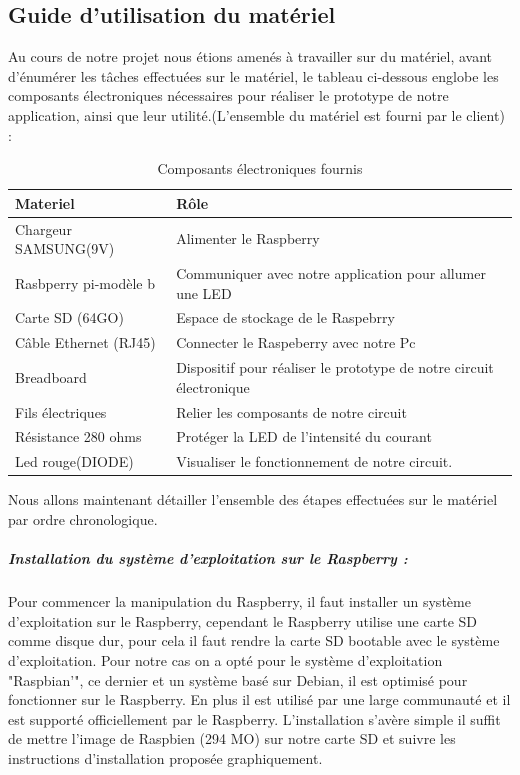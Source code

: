 \documentclass[12pt,a4paper]{article}
\begin{document}
\subsection{Guide d'utilisation du matériel}
Au cours de notre projet nous étions amenés à travailler sur du matériel, avant d'énumérer les tâches effectuées sur le matériel, le tableau ci-dessous englobe les composants électroniques nécessaires pour réaliser le prototype de notre application, ainsi que leur utilité.(L'ensemble du matériel est fourni par le client) : 
\par
\begin{table}[H]
\centering

\label{tableau3}
\begin{tabular}{|l|l|}
\hline
Materiel                      & Rôle                                                                \\ \hline
Chargeur  SAMSUNG(9V) & Alimenter le Raspberry                                              \\ \hline
Rasbperry pi-modèle b         & Communiquer avec notre application pour  allumer  une LED              \\ \hline
Carte SD (64GO)               & Espace de stockage de le Raspebrry                                  \\ \hline
Câble Ethernet (RJ45)         & Connecter le Raspeberry avec notre Pc                               \\ \hline
Breadboard                    & Dispositif pour réaliser le prototype de notre circuit électronique \\ \hline
Fils électriques              & Relier les composants de notre circuit                              \\ \hline
Résistance 280 ohms           & Protéger la LED de l'intensité du courant                           \\ \hline
Led rouge(DIODE)                     & Visualiser le fonctionnement de notre circuit.                      \\ \hline
\end{tabular}
\caption{Composants électroniques fournis}
\end{table}
\par
Nous allons maintenant détailler l'ensemble des étapes effectuées sur le matériel par ordre chronologique.\par 

\subparagraph{Installation du système d'exploitation sur le Raspberry :} 
Pour commencer la manipulation du Raspberry, il faut installer un système d'exploitation sur le Raspberry, cependant le Raspberry utilise une carte SD comme disque dur, pour cela il faut rendre la carte SD bootable avec le système d'exploitation. Pour notre cas on a opté pour le système d'exploitation "Raspbian'", ce dernier et un système basé sur Debian, il est optimisé pour fonctionner sur le Raspberry. En plus il est utilisé par une large communauté et il est supporté officiellement par le Raspberry.
L'installation s'avère simple il suffit de mettre l'image de Raspbien (294 MO) sur notre carte SD et suivre les instructions d'installation proposée graphiquement.\par
\end{document}
